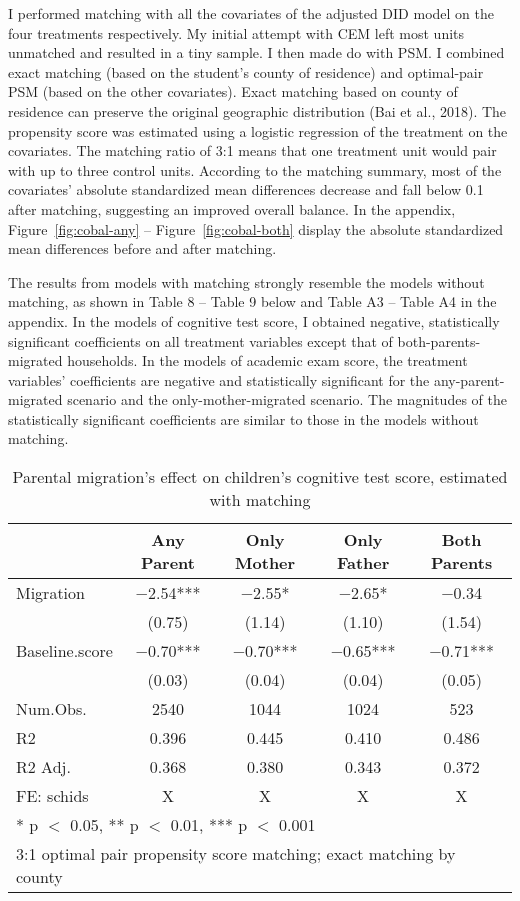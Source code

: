 \documentclass[
  man,floatsintext]{apa7}
\begin{document}
I performed matching with all the covariates of the adjusted DID model on the four treatments respectively. My initial attempt with CEM left most units unmatched and resulted in a tiny sample. I then made do with PSM. I combined exact matching (based on the student's county of residence) and optimal-pair PSM (based on the other covariates). Exact matching based on county of residence can preserve the original geographic distribution (Bai et al., 2018). The propensity score was estimated using a logistic regression of the treatment on the covariates. The matching ratio of 3:1 means that one treatment unit would pair with up to three control units. According to the matching summary, most of the covariates' absolute standardized mean differences decrease and fall below 0.1 after matching, suggesting an improved overall balance. In the appendix, Figure~\ref{fig:cobal-any} -- Figure~\ref{fig:cobal-both} display the absolute standardized mean differences before and after matching.

The results from models with matching strongly resemble the models without matching, as shown in Table 8 -- Table 9 below and Table A3 -- Table A4 in the appendix. In the models of cognitive test score, I obtained negative, statistically significant coefficients on all treatment variables except that of both-parents-migrated households. In the models of academic exam score, the treatment variables' coefficients are negative and statistically significant for the any-parent-migrated scenario and the only-mother-migrated scenario. The magnitudes of the statistically significant coefficients are similar to those in the models without matching.

\begin{table}

\caption{Parental migration’s effect on children’s cognitive test score, estimated with matching}
\centering
\begin{tabular}[t]{lcccc}
\toprule
  & Any Parent & Only Mother & Only Father & Both Parents\\
\midrule
Migration & \num{-2.54}*** & \num{-2.55}* & \num{-2.65}* & \num{-0.34}\\
 & (\num{0.75}) & (\num{1.14}) & (\num{1.10}) & (\num{1.54})\\
Baseline.score & \num{-0.70}*** & \num{-0.70}*** & \num{-0.65}*** & \num{-0.71}***\\
 & (\num{0.03}) & (\num{0.04}) & (\num{0.04}) & (\num{0.05})\\
\midrule
Num.Obs. & \num{2540} & \num{1044} & \num{1024} & \num{523}\\
R2 & \num{0.396} & \num{0.445} & \num{0.410} & \num{0.486}\\
R2 Adj. & \num{0.368} & \num{0.380} & \num{0.343} & \num{0.372}\\
FE: schids & X & X & X & X\\
\bottomrule
\multicolumn{5}{l}{\rule{0pt}{1em}* p $<$ 0.05, ** p $<$ 0.01, *** p $<$ 0.001}\\
\multicolumn{5}{l}{\rule{0pt}{1em}3:1 optimal pair propensity score matching; exact matching by county}\\
\end{tabular}
\end{table}
\end{document}

